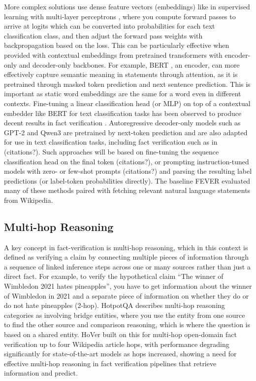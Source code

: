 \vspace{\baselineskip}
\noindent More complex solutions use dense feature vectors (embeddings) like in supervised learning with multi-layer perceptrons \parencite{christopher2006pattern}, where you compute forward passes to arrive at logits which can be converted into probabilities for each text classification class, and then adjust the forward pass weights with backpropagation based on the loss. This can be particularly effective when provided with contextual embeddings from pretrained transformers \parencite{vaswani2017attention} with encoder-only and decoder-only backbones. For example, BERT \parencite{devlin2019bert}, an encoder, can more effectively capture semantic meaning in statements through attention, as it is pretrained through masked token prediction and next sentence prediction. This is important as static word embeddings are the same for a word even in different contexts. Fine-tuning a linear classification head (or MLP) on top of a contextual embedder like BERT for text classification tasks has been observed to produce decent results in fact verification \parencite{vijjali2020two, soleimani2020bert}. Autoregressive decoder-only models such as GPT-2 \parencite{radford2019language} and Qwen3 \parencite{yang2025qwen3} are pretrained by next-token prediction and are also adapted for use in text classification tasks, including fact verification such as in (citations?). Such approaches will be based on fine-tuning the sequence classification head on the final token (citations?), or prompting instruction-tuned models with zero- or few-shot prompts (citations?) and parsing the resulting label predictions (or label-token probabilities directly). The baseline FEVER \parencite{thorne2018fever} evaluated many of these methods paired with fetching relevant natural language statements from Wikipedia.


\subsection{Multi-hop Reasoning}
A key concept in fact-verification is multi-hop reasoning, which in this context is defined as verifying a claim by connecting multiple pieces of information through a sequence of linked inference steps across one or many sources rather than just a direct fact. For example, to verify the hypothetical claim “The winner of Wimbledon 2021 hates pineapples”, you have to get information about the winner of Wimbledon in 2021 and a separate piece of information on whether they do or do not hate pineapples (2-hop). HotpotQA \parencite{yang2018hotpotqa} describes multi-hop reasoning categories as involving bridge entities, where you use the entity from one source to find the other source and comparison reasoning, which is where the question is based on a shared entity. HoVer \parencite{jiang2020hover} built on this for multi-hop open-domain fact verification up to four Wikipedia article hops, with performance degrading significantly for state-of-the-art models as hops increased, showing a need for effective multi-hop reasoning in fact verification pipelines that retrieve information and predict. 

